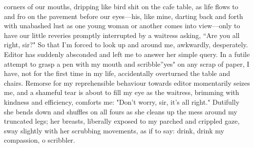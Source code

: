 \documentclass[
]{memoir}
\begin{document}
corners of our mouths, dripping like bird shit on the cafe table, as
life flows to and fro on the pavement before our eyes---his, like mine,
darting back and forth with unabashed lust as one young woman or another
comes into view---only to have our little reveries promptly interrupted
by a waitress asking, ``Are you all right, sir?" So that I'm forced to
look up and around me, awkwardly, desperately. Editor has suddenly
absconded and left me to answer her simple query. In a futile attempt to
grasp a pen with my mouth and scribble''yes" on any scrap of paper, I
have, not for the first time in my life, accidentally overturned the
table and chairs. Remorse for my reprehensible behaviour towards editor
momentarily seizes me, and a shameful tear is about to fill my eye as
the waitress, brimming with kindness and efficiency, comforts me: "Don't
worry, sir, it's all right." Dutifully she bends down and shuffles on
all fours as she cleans up the mess around my truncated legs; her
breasts, liberally exposed to my parched and crippled gaze, sway
slightly with her scrubbing movements, as if to say: drink, drink my
compassion, o scribbler.
\end{document}

